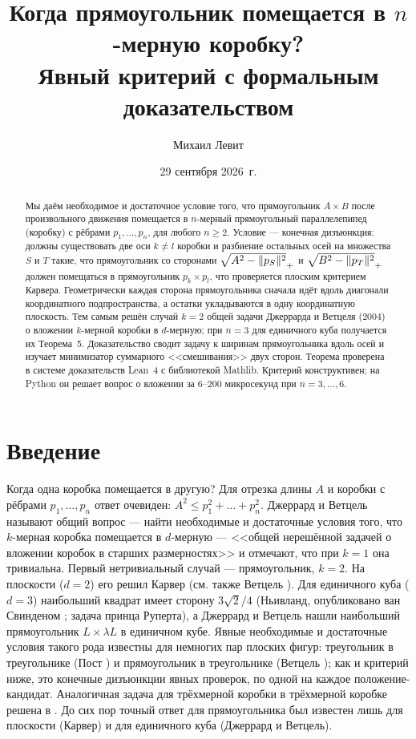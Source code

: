 \documentclass[11pt]{article}
\title{Когда прямоугольник помещается в $n$-мерную коробку?\\ Явный критерий с формальным доказательством}
\author{Михаил Левит}
\date{29 сентября 2026~г.}
\theoremstyle{definition}
\theoremstyle{remark}
\DeclarePairedDelimiter{\norm}{\lVert}{\rVert}
\begin{document}
\maketitle

\begin{abstract}
Мы даём необходимое и достаточное условие того, что прямоугольник $A\times B$ после произвольного
движения помещается в $n$-мерный прямоугольный параллелепипед (коробку) с рёбрами $p_1,\dots,p_n$, для
любого $n\ge2$. Условие --- конечная дизъюнкция: должны существовать две оси $k\ne l$ коробки и разбиение
остальных осей на множества $S$ и $T$ такие, что прямоугольник со сторонами
$\sqrt{A^2-\norm{p_S}^2}_+$ и $\sqrt{B^2-\norm{p_T}^2}_+$ должен помещаться в прямоугольник
$p_k\times p_l$, что проверяется плоским критерием Карвера. Геометрически каждая сторона прямоугольника
сначала идёт вдоль диагонали координатного подпространства, а остатки укладываются в одну координатную
плоскость. Тем самым решён случай $k=2$ общей задачи Джеррарда и Ветцеля (2004) о вложении
$k$-мерной коробки в $d$-мерную; при $n=3$ для единичного куба получается их Теорема~5. Доказательство
сводит задачу к ширинам прямоугольника вдоль осей и изучает минимизатор суммарного <<смешивания>> двух
сторон. Теорема проверена в системе доказательств Lean~4 с библиотекой Mathlib. Критерий конструктивен; на
Python он решает вопрос о вложении за $6$--$200$ микросекунд при $n=3,\dots,6$.
\end{abstract}

\section{Введение}

Когда одна коробка помещается в другую? Для отрезка длины $A$ и коробки с рёбрами $p_1,\dots,p_n$ ответ
очевиден: $A^2\le p_1^2+\dots+p_n^2$. Джеррард и Ветцель \cite[с.~22]{JerrardWetzel2004} называют общий
вопрос --- найти необходимые и достаточные условия того, что $k$-мерная коробка помещается в $d$-мерную ---
<<общей нерешённой задачей о вложении коробок в старших размерностях>> и отмечают, что при $k=1$ она
тривиальна. Первый нетривиальный случай --- прямоугольник, $k=2$. На плоскости ($d=2$) его решил Карвер
\cite{Carver1957} (см. также Ветцель \cite{Wetzel2000}). Для единичного куба ($d=3$) наибольший квадрат
имеет сторону $3\sqrt2/4$ (Ньивланд, опубликовано ван Свинденом \cite{vanSwinden1816}; задача принца
Руперта), а Джеррард и Ветцель \cite[Theorem~5]{JerrardWetzel2004} нашли наибольший прямоугольник
$L\times\lambda L$ в единичном кубе. Явные необходимые и достаточные условия такого рода известны для
немногих пар плоских фигур: треугольник в треугольнике (Пост \cite{Post1993}) и прямоугольник в треугольнике
(Ветцель \cite{Wetzel2004}); как и критерий ниже, это конечные дизъюнкции явных проверок, по одной на каждое
положение-кандидат. Аналогичная задача для трёхмерной коробки в трёхмерной коробке решена в
\cite{Levit2026}. До сих пор точный ответ для прямоугольника был известен лишь для плоскости (Карвер) и для
единичного куба (Джеррард и Ветцель).
\end{document}
